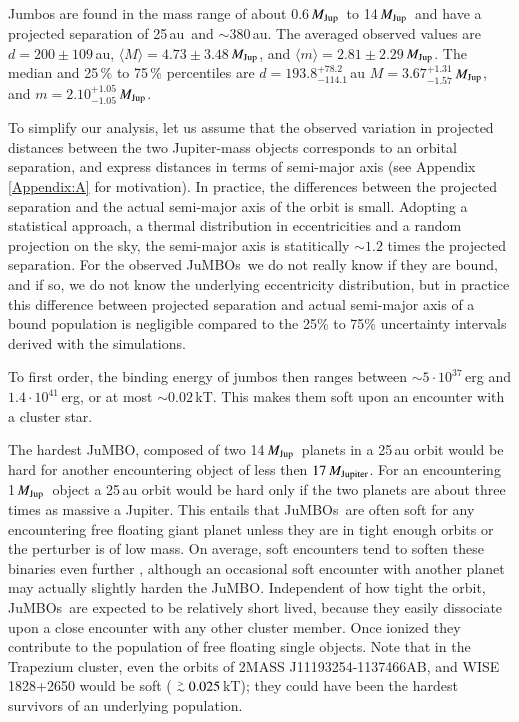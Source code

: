 \documentclass[submission,phys]{lib/SciPost}
\newcommand{\MJup}{\mbox{${M}_{\rm Jup}$}}
\def\apgt{\ {\raise-.5ex\hbox{$\buildrel>\over\sim$}}\ }
\newcommand{\jumbo}{\mbox{JuMBO}}
\newcommand{\jumbos}{\mbox{JuMBOs}}
\begin{document}
Jumbos are found in the mass range of about 0.6\,\MJup\, to
14\,\MJup\, and have a projected separation of 25\,au\, and $\sim
380$\,au.  The averaged observed values are $d=200\pm109$\,au,
$\langle M\rangle = 4.73\pm3.48$\,\MJup, and $\langle m\rangle =
2.81\pm2.29$\,\MJup. The median and 25\,\% to 75\,\% percentiles are
$d = 193.8^{+78.2}_{-114.1}$\,au $M = 3.67^{+1.31}_{-1.57}$\,\MJup,
and $m = 2.10^{+1.05}_{-1.05}$\,\MJup.

To simplify our analysis, let us assume that the observed variation in
projected distances between the two Jupiter-mass objects corresponds
to an orbital separation, and express distances in terms of semi-major
axis (see Appendix\,\ref{Appendix:A} for motivation).  In practice,
the differences between the projected separation and the actual
semi-major axis of the orbit is small. Adopting a statistical
approach, a thermal distribution in eccentricities and a random
projection on the sky, the semi-major axis is statitically $\sim 1.2$
times the projected separation.  For the observed \jumbos\, we do not
really know if they are bound, and if so, we do not know the
underlying eccentricity distribution, but in practice this difference
between projected separation and actual semi-major axis of a bound
population is negligible compared to the 25\% to 75\% uncertainty
intervals derived with the simulations.

To first order, the binding energy of jumbos then ranges between $\sim
5\cdot 10^{37}$\,erg and $1.4\cdot 10^{41}$\,erg, or at most $\sim
0.02$\,kT. This makes them soft upon an encounter with a cluster star.

The hardest \jumbo, composed of two 14\,\MJup\, planets in a 25\,au
orbit would be hard for another encountering object of less then
$17\,M_{\rm Jupiter}$.  For an encountering 1\,\MJup\, object a 25\,au
orbit would be hard only if the two planets are about three times as
massive a Jupiter.  This entails that \jumbos\, are often soft for any
encountering free floating giant planet unless they are in tight
enough orbits or the perturber is of low mass.  On average, soft
encounters tend to soften these binaries even further
\cite{1975MNRAS.173..729H}, although an occasional soft encounter with
another planet may actually slightly harden the \jumbo.  Independent
of how tight the orbit, \jumbos\, are expected to be relatively short
lived, because they easily dissociate upon a close encounter with any
other cluster member.  Once ionized they contribute to the population
of free floating single objects.  Note that in the Trapezium cluster,
even the orbits of 2MASS J11193254-1137466AB, and WISE 1828+2650 would
be soft ($\apgt 0.025$\,kT); they could have been the hardest
survivors of an underlying population.
\end{document}
